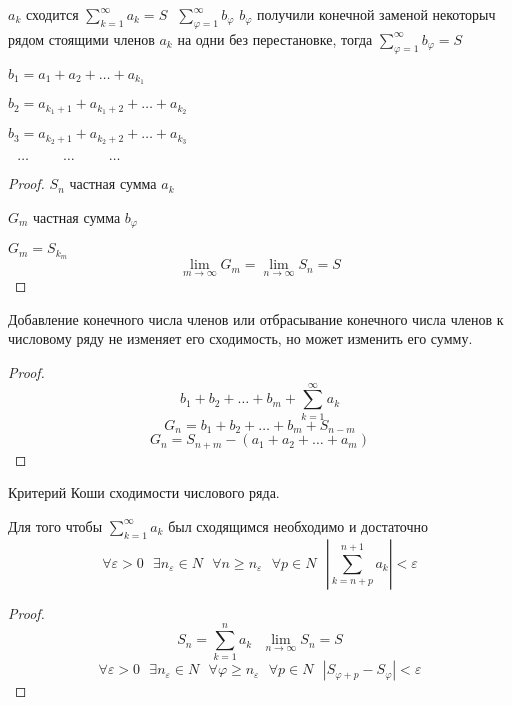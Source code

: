 \begin{theorem}
  $a_k$ сходится
  $
  \sum_{k=1}^{\infty} a_k = S ~~~ \sum_{\varphi = 1}^{\infty} b_{\varphi}
  $
  $b_{\varphi}$ получили конечной заменой некоторыч рядом стоящими членов $a_k$
  на одни без перестановке, тогда
  $
  \sum_{\varphi = 1}^{\infty} b_{\varphi} = S
  $

  $
  b_1 = a_1 + a_2 + \ldots + a_{k_1}
  $

  $
  b_2 = a_{k_1+1} + a_{k_1+2} + \ldots + a_{k_2}
  $

  $
  b_3 = a_{k_2+1} + a_{k_2+2} + \ldots + a_{k_3}
  $

  $~~~ \ldots ~~~~~~~~~~~ \ldots ~~~~~~~~~~~ \ldots$
\end{theorem}

\begin{proof}
  $S_n$ частная сумма $a_k$

  $G_m$ частная сумма $b_{\varphi}$

  $G_m = S_{k_m}$
  $$
  \lim_{m \to \infty} G_m = \lim_{n \to \infty} S_n = S
  $$
\end{proof}

\begin{theorem}
  Добавление конечного числа членов или отбрасывание конечного числа членов к
числовому ряду не изменяет его сходимость, но может изменить его сумму.
\end{theorem}

\begin{proof}
  $$
  b_1 + b_2 + \ldots + b_m + \sum_{k=1}^{\infty} a_k
  $$
  $$
  G_n = b_1 + b_2 + \ldots + b_m + S_{n-m}
  $$
  $$
  G_n = S_{n+m} - (a_1 + a_2 + \ldots + a_m)
  $$
\end{proof}

\begin{title}[\Large]
  Критерий Коши сходимости числового ряда.
\end{title}

\begin{block}
  Для того чтобы $\sum_{k=1}^{\infty} a_k$ был сходящимся необходимо и
  достаточно
  $$
  \forall \varepsilon > 0 ~~~
  \exists n_{\varepsilon} \in N ~~~
  \forall n \ge n_{\varepsilon} ~~~
  \forall p \in N ~~~
  \left| \sum_{k=n+p}^{n+1} a_k \right| < \varepsilon
  $$
\end{block}

\begin{proof}
  $$
  S_n = \sum_{k=1}^n a_k ~~~ \lim_{n \to \infty} S_n = S
  $$
  $$
  \forall \varepsilon > 0 ~~~
  \exists n_{\varepsilon} \in N ~~~
  \forall \varphi \ge n_{\varepsilon} ~~~
  \forall p \in N ~~~
  \left| S_{\varphi + p} - S_{\varphi} \right| < \varepsilon
  $$
\end{proof}

